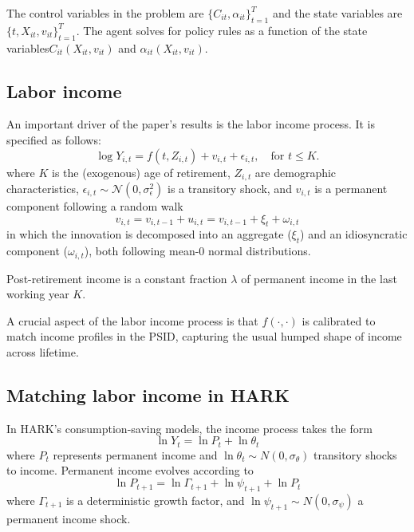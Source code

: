 \documentclass[./CGMPort.tex]{subfiles}
\begin{document}
The control variables in the problem are $\{C_{it}, \alpha_{it}\}^T_{t=1}$ and the state variables are $\{t, X_{it}, v_{it} \}^T_{t=1}$. The agent solves for  policy rules as a function of the state variables\textemdash $C_{it}(X_{it}, v_{it})$ and $\alpha_{it}(X_{it}, v_{it})$.

\subsection{Labor income}

An important driver of the paper's results is the labor income process. It is 
specified as follows:
\begin{equation}
\log Y_{i,t} = f(t,Z_{i,t}) + v_{i,t} + \epsilon_{i,t}, \quad \text{for } t\leq K.
\end{equation}
where $K$ is the (exogenous) age of retirement, $Z_{i,t}$ are demographic 
characteristics, $\epsilon_{i,t}\sim \mathcal{N}(0,\sigma^2_\epsilon)$ is a 
transitory shock, and  $v_{i,t}$ is a permanent component following a random 
walk
\begin{equation}
v_{i,t} = v_{i,t-1} + u_{i,t} = v_{i,t-1} + \xi_t + \omega_{i,t}
\end{equation}
in which the innovation is decomposed into an aggregate ($\xi_t$) and an 
idiosyncratic component ($\omega_{i,t}$), both following mean-0 normal 
distributions.

Post-retirement income is a constant fraction $\lambda$ of permanent income in the last working year $K$.

A crucial aspect of the labor income process is that $f(\cdot,\cdot)$ is calibrated to match income profiles in the PSID, capturing the usual humped shape of income across lifetime.

\subsection{Matching labor income in HARK}

In HARK's consumption-saving models, the income process takes the form
\begin{equation}
\ln Y_t = \ln P_t + \ln \theta_t
\end{equation}
where $P_t$ represents permanent income and $\ln \theta_t \sim N(0,\sigma_\theta)$ transitory shocks to income. Permanent income evolves according to
\begin{equation}
\ln P_{t+1} = \ln \Gamma_{t+1} +  \ln \psi_{t+1} + \ln P_t
\end{equation}
where $\Gamma_{t+1}$ is a deterministic growth factor, and $\ln \psi_{t+1} \sim N(0,\sigma_\psi)$ a permanent income shock. 
\end{document}
